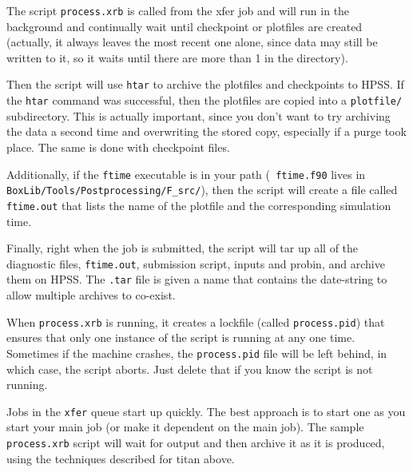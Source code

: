 The script {\tt process.xrb} is called from the xfer job and will
run in the background and continually wait until checkpoint or                  
plotfiles are created (actually, it always leaves the most recent one           
alone, since data may still be written to it, so it waits until there           
are more than 1 in the directory).                                              
                                                                                
Then the script will use {\tt htar} to archive the plotfiles and                
checkpoints to HPSS.  If the {\tt htar} command was successful, then            
the plotfiles are copied into a {\tt plotfile/} subdirectory.  This is          
actually important, since you don't want to try archiving the data a            
second time and overwriting the stored copy, especially if a purge              
took place.  The same is done with checkpoint files.
                                                                                
Additionally, if the {\tt ftime} executable is in your path ({\tt               
ftime.f90} lives in {\tt BoxLib/Tools/Postprocessing/F\_src/}), then            
the script will create a file called {\tt ftime.out} that lists the             
name of the plotfile and the corresponding simulation time.                     
                                                                                
Finally, right when the job is submitted, the script will tar up all
of the diagnostic files, {\tt ftime.out}, submission script, inputs
and probin, and archive them on HPSS.  The {\tt .tar} file is given a
name that contains the date-string to allow multiple archives to
co-exist.
                                                                    
When {\tt process.xrb} is running, it creates a lockfile (called              
{\tt process.pid}) that ensures that only one instance of the script            
is running at any one time.  Sometimes if the machine crashes, the              
{\tt process.pid} file will be left behind, in which case, the script           
aborts.  Just delete that if you know the script is not running.   

Jobs in the {\tt xfer} queue start up quickly.  The best approach is            
to start one as you start your main job (or make it dependent on the            
main job).  The sample {\tt process.xrb} script will wait for output            
and then archive it as it is produced, using the techniques described           
for titan above.                                                                
                                                                                
